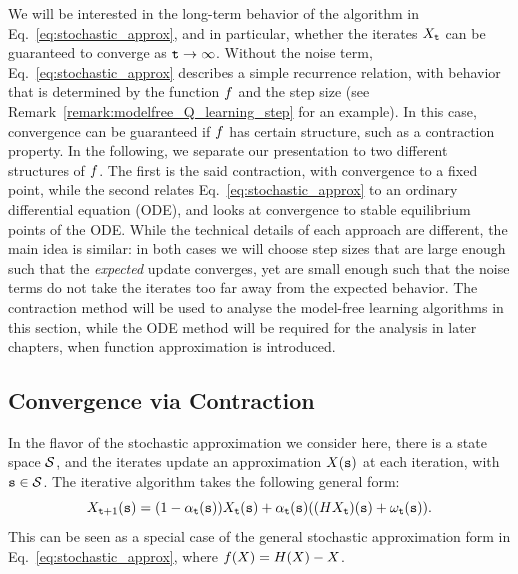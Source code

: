 We will be interested in the long-term behavior of the algorithm in Eq.~\ref{eq:stochastic_approx}, and in particular, whether the iterates $X_{\tt t}$ can be guaranteed to converge as ${\tt t} \to \infty$.
Without the noise term, Eq.~\ref{eq:stochastic_approx} describes a simple recurrence relation, with behavior that is determined by the function $f$ and the step size (see Remark~\ref{remark:modelfree_Q_learning_step} for an example). In this case, convergence can be guaranteed if $f$ has certain structure, such as a contraction property. In the following, we separate our presentation to two different structures of $f$. The first is the said contraction, with convergence to a fixed point, while the second relates Eq.~\ref{eq:stochastic_approx} to an ordinary differential equation (ODE), and looks at convergence to stable equilibrium points of the ODE. While the technical details of each approach are different, the main idea is similar: in both cases we will choose step sizes that are large enough such that the \textit{expected} update converges, yet are small enough such that the noise terms do not take the iterates too far away from the expected behavior. The contraction method will be used to analyse the model-free learning algorithms in this section, while the ODE method will be required for the analysis in later chapters, when function approximation is introduced.

\subsection{Convergence via Contraction}
In the flavor of the stochastic approximation we consider here, there is a state space $\mathcal{S}$, and
the iterates update an approximation $X({\tt s})$ at each iteration, with ${\tt s} \in \mathcal{S}$. 
The iterative algorithm takes the following general form:
\[
X_{{\tt t}+1}({\tt s}) =
(1-\alpha_{\tt t}({\tt s}))X_{\tt t}({\tt s})+\alpha_{\tt t}({\tt s})((HX_{\tt t})({\tt s})+\omega_{\tt t}({\tt s})).
\]
This can be seen as a special case of the general stochastic approximation form in Eq.~\ref{eq:stochastic_approx}, where $f(X) = H(X) - X$.

